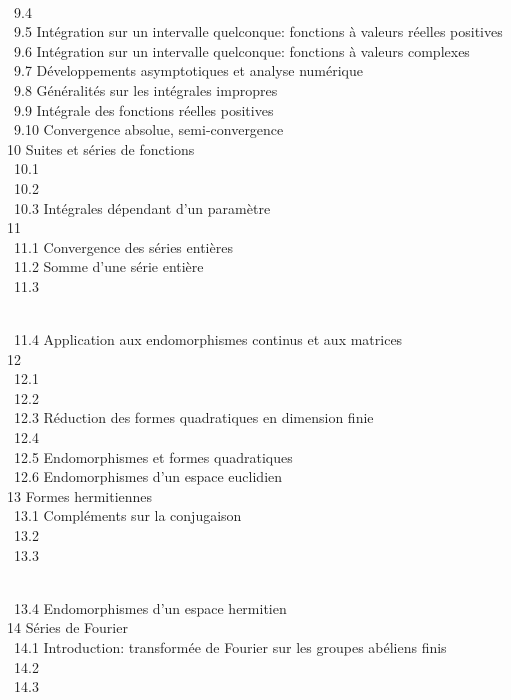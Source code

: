 \documentclass[]{article}
\begin{document}
 \\ ~9.4
 \\ ~9.5
{Intégration sur un intervalle
quelconque: fonctions à valeurs réelles positives} \\ ~9.6
{Intégration sur un intervalle
quelconque: fonctions à valeurs complexes} \\ ~9.7
{Développements asymptotiques et
analyse numérique} \\ ~9.8
{Généralités sur les intégrales
impropres} \\ ~9.9 {Intégrale des
fonctions réelles positives} \\ ~9.10
{Convergence absolue,
semi-convergence} \\ 10 {Suites et
séries de fonctions} \\ ~10.1
 \\ ~10.2
 \\ ~10.3
{Intégrales dépendant d'un
paramètre} \\ 11  \\
~11.1 {Convergence des séries
entières} \\ ~11.2 {Somme d'une
série entière} \\ ~11.3

\\ ~11.4 {Application aux
endomorphismes continus et aux matrices} \\ 12
 \\ ~12.1
 \\ ~12.2
 \\ ~12.3
{Réduction des formes quadratiques
en dimension finie} \\ ~12.4
 \\
~12.5 {Endomorphismes et formes
quadratiques} \\ ~12.6
{Endomorphismes d'un espace
euclidien} \\ 13 {Formes
hermitiennes} \\ ~13.1 {Compléments
sur la conjugaison} \\ ~13.2
 \\ ~13.3

\\ ~13.4 {Endomorphismes d'un
espace hermitien} \\ 14 {Séries de
Fourier} \\ ~14.1 {Introduction:
transformée de Fourier sur les groupes abéliens finis} \\ ~14.2
 \\ ~14.3
\end{document}
